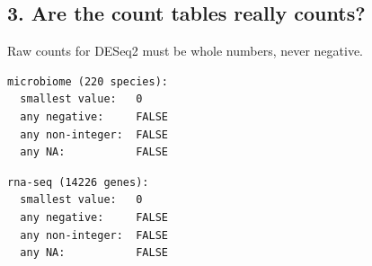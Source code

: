 \documentclass[
  letterpaper,
  DIV=11,
  numbers=noendperiod]{scrartcl}
\newenvironment{Shaded}{\begin{snugshade}}{\end{snugshade}}
\newcommand{\AttributeTok}[1]{\textcolor[rgb]{0.40,0.45,0.13}{#1}}
\newcommand{\ControlFlowTok}[1]{\textcolor[rgb]{0.00,0.23,0.31}{\textbf{#1}}}
\newcommand{\DecValTok}[1]{\textcolor[rgb]{0.68,0.00,0.00}{#1}}
\newcommand{\FunctionTok}[1]{\textcolor[rgb]{0.28,0.35,0.67}{#1}}
\newcommand{\NormalTok}[1]{\textcolor[rgb]{0.00,0.23,0.31}{#1}}
\newcommand{\OtherTok}[1]{\textcolor[rgb]{0.00,0.23,0.31}{#1}}
\newcommand{\SpecialCharTok}[1]{\textcolor[rgb]{0.37,0.37,0.37}{#1}}
\newcommand{\StringTok}[1]{\textcolor[rgb]{0.13,0.47,0.30}{#1}}
\begin{document}
\subsection{3. Are the count tables really
counts?}\label{are-the-count-tables-really-counts}

Raw counts for DESeq2 must be whole numbers, never negative.

\begin{Shaded}
\end{Shaded}

\begin{verbatim}
microbiome (220 species):
  smallest value:   0
  any negative:     FALSE
  any non-integer:  FALSE
  any NA:           FALSE
\end{verbatim}

\begin{Shaded}
\end{Shaded}

\begin{verbatim}
rna-seq (14226 genes):
  smallest value:   0
  any negative:     FALSE
  any non-integer:  FALSE
  any NA:           FALSE
\end{verbatim}
\end{document}
